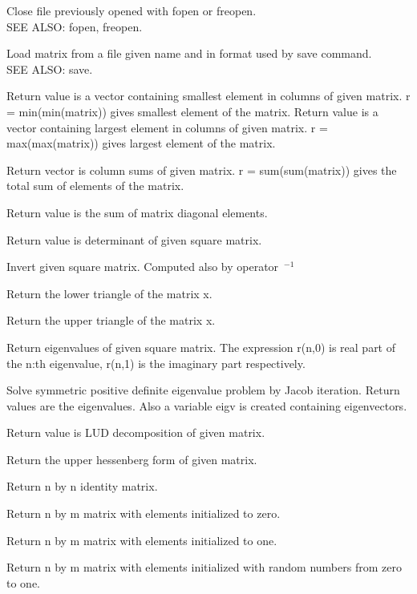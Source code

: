 Close file previously opened with fopen or freopen. \\
SEE ALSO: fopen, freopen. 

Load matrix from a file given name and in format used by save command. \\
SEE ALSO: save. 

Return value is a vector containing smallest element in columns of given matrix. r = min(min(matrix)) gives smallest element of the matrix. 
Return value is a vector containing largest element in columns of given matrix. r = max(max(matrix)) gives largest element of the matrix. 

Return vector is column sums of given matrix. r = sum(sum(matrix)) gives the total sum of elements of the matrix.

Return value is the sum of matrix diagonal elements. 

Return value is determinant of given square matrix. 

Invert given square matrix. Computed also by operator~$^{-1}$

Return the lower triangle of the matrix x. 

Return the upper triangle of the matrix x. 

Return eigenvalues of given square matrix. The expression r(n,0) is real part of the n:th eigenvalue, r(n,1) is the imaginary part respectively. 

Solve symmetric positive definite eigenvalue problem by Jacob iteration. Return values are the eigenvalues. Also a variable eigv is created containing eigenvectors. 

Return value is LUD decomposition of given matrix. 

Return the upper hessenberg form of given matrix. 

Return n by n identity matrix. 

Return n by m matrix with elements initialized to zero. 

Return n by m matrix with elements initialized to one. 

Return n by m matrix with elements initialized with random numbers from zero to one. 

